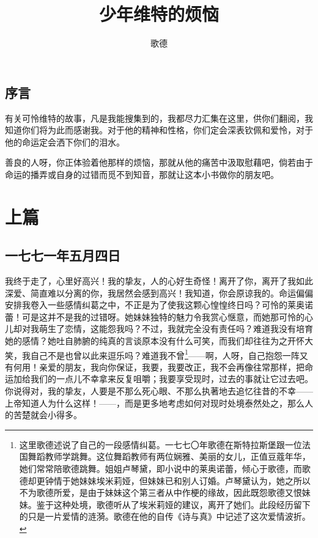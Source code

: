 \documentclass[12pt,oneside]{book}
\title{少年维特的烦恼}
\author{歌德}
\begin{document}



\frontmatter 
{}
\chapter*{序言}
\begin{framed}
有关可怜维特的故事，凡是我能搜集到的，我都尽力汇集在这里，供你们翻阅，我知道你们将为此而感谢我。对于他的精神和性格，你们定会深表钦佩和爱怜，对于他的命运定会洒下你们的泪水。

善良的人呀，你正体验着他那样的烦恼，那就从他的痛苦中汲取慰藉吧，倘若由于命运的播弄或自身的过错而觅不到知音，那就让这本小书做你的朋友吧。
\end{framed}

\setcounter{tocdepth}{2}    
\tableofcontents


\mainmatter
\part{上篇}
\chapter{一七七一年五月四日}
我终于走了，心里好高兴！我的挚友，人的心好生奇怪！离开了你，离开了我如此深爱、简直难以分离的你，我居然会感到高兴！我知道，你会原谅我的。命运偏偏安排我卷入一些感情纠葛之中，不正是为了使我这颗心惶惶终日吗？可怜的莱奥诺蕾！可是这并不是我的过错呀。她妹妹独特的魅力令我赏心惬意，而她那可怜的心儿却对我萌生了恋情，这能怨我吗？不过，我就完全没有责任吗？难道我没有培育她的感情？她吐自肺腑的纯真的言谈原本没有什么可笑，而我们却往往为之开怀大笑，我自己不是也曾以此来逗乐吗？难道我不曾\footnote{这里歌德述说了自己的一段感情纠葛。一七七〇年歌德在斯特拉斯堡跟一位法国舞蹈教师学跳舞。这位舞蹈教师有两位娴雅、美丽的女儿，正值豆蔻年华，她们常常陪歌德跳舞。姐姐卢琴黛，即小说中的莱奥诺蕾，倾心于歌德，而歌德却更钟情于她妹妹埃米莉娅，但妹妹已和别人订婚。卢琴黛认为，她之所以不为歌德所爱，是由于妹妹这个第三者从中作梗的缘故，因此既怨歌德又恨妹妹。鉴于这种处境，歌德听从了埃米莉娅的建议，离开了她们。此段经历留下的只是一片爱情的涟漪。歌德在他的自传《诗与真》中记述了这次爱情波折。}——啊，人呀，自己抱怨一阵又有何用！亲爱的朋友，我向你保证，我要，我要改正，我不会再像往常那样，把命运加给我们的一点儿不幸拿来反复咀嚼；我要享受现时，过去的事就让它过去吧。你说得对，我的挚友，人要是不那么死心眼、不那么执著地去追忆往昔的不幸——上帝知道人为什么这样！——，而是更多地考虑如何对现时处境泰然处之，那么人的苦楚就会小得多。
\end{document}
